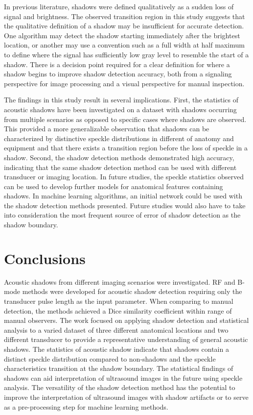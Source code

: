 \documentclass[authoryear,preprint,review,12pt]{elsarticle}
\begin{document}
In previous literature, shadows were defined qualitatively \citep{Kremkau1986} as a sudden loss of signal and brightness. The observed transition region in this study suggests that the qualitative definition of a shadow may be insufficient for accurate detection. One algorithm may detect the shadow starting immediately after the brightest location, or another may use a convention such as a full width at half maximum to define where the signal has sufficiently low gray level to resemble the start of a shadow. There is a decision point required for a clear definition for where a shadow begins to improve shadow detection accuracy, both from a signaling perspective for image processing and a visual perspective for manual inspection. 

The findings in this study result in several implications. First, the statistics of acoustic shadows have been investigated on a dataset with shadows occurring from multiple scenarios as opposed to specific cases where shadows are observed. This provided a more generalizable observation that shadows can be characterized by distinctive speckle distributions in different of anatomy and equipment and that there exists a transition region before the loss of speckle in a shadow. Second, the shadow detection methods demonstrated high accuracy, indicating that the same shadow detection method can be used with different transducer or imaging location. In future studies, the speckle statistics observed can be used to develop further models for anatomical features containing shadows. In machine learning algorithms, an initial network could be used with the shadow detection methods presented. Future studies would also have to take into consideration the most frequent source of error of shadow detection as the shadow boundary.

\section*{Conclusions}
\label{Conclusions}
Acoustic shadows from different imaging scenarios were investigated. RF and B-mode methods were developed for acoustic shadow detection requiring only the transducer pulse length as the input parameter. When comparing to manual detection, the methods achieved a Dice similarity coefficient within range of manual observers. The work focused on applying shadow detection and statistical analysis to a varied dataset of three different anatomical locations and two different transducer to provide a representative understanding of general acoustic shadows. The statistics of acoustic shadow indicate that shadows contain a distinct speckle distribution compared to non-shadows and the speckle characteristics transition at the shadow boundary. The statistical findings of shadows can aid interpretation of ultrasound images in the future using speckle analysis. The versatility of the shadow detection method has the potential to improve the interpretation of ultrasound images with shadow artifacts or to serve as a pre-processing step for machine learning methods.
\end{document}
